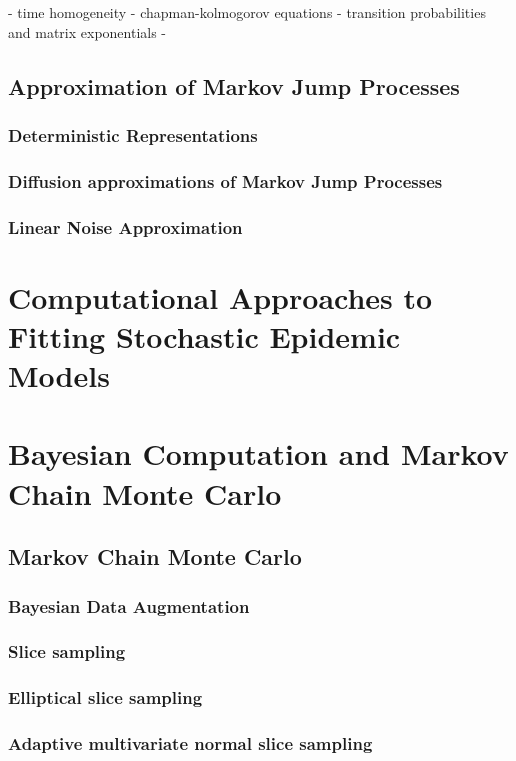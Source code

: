 - time homogeneity
- chapman-kolmogorov equations
- transition probabilities and matrix exponentials
- 

\subsection{Approximation of Markov Jump Processes}
\label{subsec:sem_approximations}

\subsubsection{Deterministic Representations}
\label{subsec:deterministic_models}

\subsubsection{Diffusion approximations of Markov Jump Processes}
\label{subsubsec:diff_approx}

\subsubsection{Linear Noise Approximation}
\label{subsubsec:lna_background}

\section{Computational Approaches to Fitting Stochastic Epidemic Models}
\label{sec:computational_background}

\section{Bayesian Computation and Markov Chain Monte Carlo}
\label{sec:bayesian_computation}

\subsection{Markov Chain Monte Carlo}
\label{subsec:mcmc}

\subsubsection{Bayesian Data Augmentation}
\label{subsec:data_augmentation}

\subsubsection{Slice sampling}
\label{subsubsec:slice_sampling}

\subsubsection{Elliptical slice sampling}
\label{subsubsec:elliptical_slice_sampling}

\subsubsection{Adaptive multivariate normal slice sampling}
\label{subsubsec:mvn_slice_sampling}